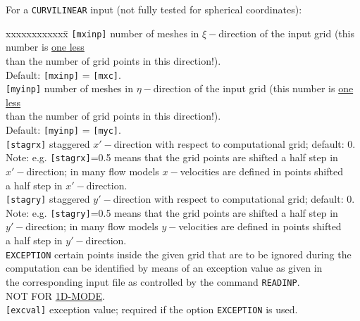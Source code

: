 \documentclass[12pt]{book}
\begin{document}
For a {\tt CURVILINEAR} input (not fully tested for spherical coordinates):
\begin{tabbing}
xxxxxxxxxxxx\= \kill
{\tt [mxinp]}       \> number of meshes in $\xi-$direction of the input grid (this number is \underline{one less}\+\\
                       than the number of grid points in this direction!).\\
                       Default: {\tt [mxinp]} = {\tt [mxc]}.\-\\
{\tt [myinp]}       \> number of meshes in $\eta-$direction of the input grid (this number is \underline{one less}\+\\
                       than the number of grid points in this direction!).\\
                       Default: {\tt [myinp]} = {\tt [myc]}.\-\\
{\tt [stagrx]}      \> staggered $x'-$direction with respect to computational grid; default: 0.\+\\
                       Note: e.g. {\tt [stagrx]}=0.5 means that the grid points are shifted a half step in\\
                       $x'-$direction; in many flow models $x-$velocities are defined in points shifted\\
                       a half step in $x'-$direction.\-\\
{\tt [stagry]}      \> staggered $y'-$direction with respect to computational grid; default: 0.\+\\
                       Note: e.g. {\tt [stagry]}=0.5 means that the grid points are shifted a half step in\\
                       $y'-$direction; in many flow models $y-$velocities are defined in points shifted\\
                       a half step in $y'-$direction.\-\\
{\tt EXCEPTION}     \> certain points inside the given grid that are to be ignored during the\+\\
                       computation can be identified by means of an exception value as given in\\
                       the corresponding input file as controlled by the command {\tt READINP}.\\
                       NOT FOR \underline{1D-MODE}.\-\\
{\tt [excval]}      \> exception value; required if the option {\tt EXCEPTION} is used.\+\\

\end{tabbing}
\end{document}

